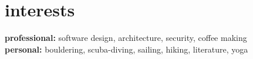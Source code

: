 \documentclass[]{friggeri-cv} %
\begin{document}

\section{interests}
\textbf{professional:} software design, architecture, security, coffee making
\\
\textbf{personal:} bouldering, scuba-diving, sailing, hiking, literature, yoga









\end{document}
